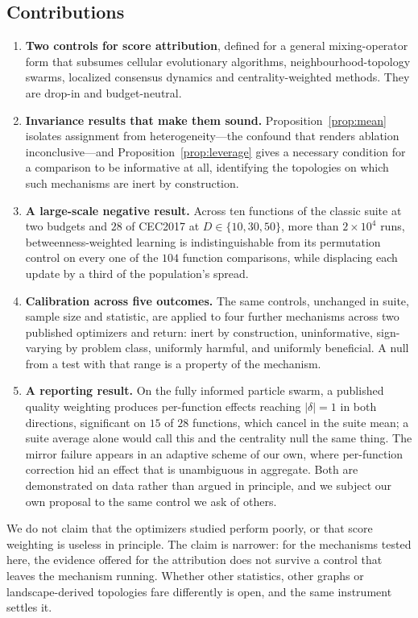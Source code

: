 \subsection*{Contributions}

\begin{enumerate}
\item \textbf{Two controls for score attribution}, defined for a general
  mixing-operator form that subsumes cellular evolutionary algorithms,
  neighbourhood-topology swarms, localized consensus dynamics and
  centrality-weighted methods. They are drop-in and budget-neutral.

\item \textbf{Invariance results that make them sound.}
  Proposition~\ref{prop:mean} isolates assignment from heterogeneity---the
  confound that renders ablation inconclusive---and
  Proposition~\ref{prop:leverage} gives a necessary condition for a comparison
  to be informative at all, identifying the topologies on which such mechanisms
  are inert by construction.

\item \textbf{A large-scale negative result.} Across ten functions of the
  classic suite at two budgets and $28$ of CEC2017 at $D\in\{10,30,50\}$, more
  than $2\times10^{4}$ runs, betweenness-weighted learning is indistinguishable
  from its permutation control on every one of the $104$ function comparisons,
  while displacing each update by a third of the population's spread.

\item \textbf{Calibration across five outcomes.} The same controls, unchanged
  in suite, sample size and statistic, are applied to four further mechanisms
  across two published optimizers and return: inert by construction,
  uninformative, sign-varying by problem class, uniformly harmful, and
  uniformly beneficial. A null from a test with that range is a property of the
  mechanism.

\item \textbf{A reporting result.} On the fully informed particle swarm, a
  published quality weighting produces per-function effects reaching
  $|\delta|=1$ in both directions, significant on $15$ of $28$ functions, which
  cancel in the suite mean; a suite average alone would call this and the
  centrality null the same thing. The mirror failure appears in an adaptive
  scheme of our own, where per-function correction hid an effect that is
  unambiguous in aggregate. Both are demonstrated on data rather than argued in
  principle, and we subject our own proposal to the same control we ask of
  others.
\end{enumerate}

We do not claim that the optimizers studied perform poorly, or that score
weighting is useless in principle. The claim is narrower: for the mechanisms
tested here, the evidence offered for the attribution does not survive a
control that leaves the mechanism running. Whether other statistics, other
graphs or landscape-derived topologies fare differently is open, and the same
instrument settles it.

